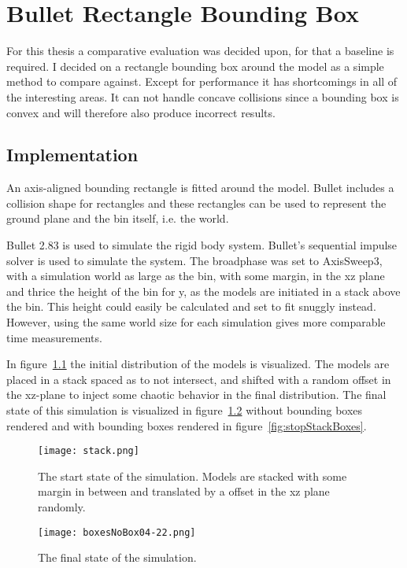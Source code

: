 \chapter{Bullet Rectangle Bounding Box}\label{cha:meth}
For this thesis a comparative evaluation was decided upon, for that a baseline is
required. I decided on a rectangle bounding box around the model
as a simple method to compare against. Except for performance it has shortcomings
in all of the interesting areas. It can not handle concave collisions since a bounding
box is convex and will therefore also produce incorrect results.

\section{Implementation}\label{sec:recImpl}
An axis-aligned bounding rectangle is fitted around the model.
Bullet includes a collision shape for rectangles and these rectangles can be used
to represent the ground plane and the bin itself, i.e. the world.

Bullet 2.83 is used to simulate the rigid body system.
Bullet's sequential impulse solver is used to simulate the system. The broadphase
was set to AxisSweep3, with a simulation world as large as the bin, with some margin, in the
xz plane and thrice the height of the bin for y, as the models are initiated in a stack
above the bin. This height could easily be calculated and set to fit snuggly instead.
However, using the same world size for each simulation gives more comparable time measurements.

In figure~\ref{fig:startStack} the initial distribution of the models is visualized.
The models are placed in a stack spaced as to not intersect, and shifted with a random
offset in the xz-plane to inject some chaotic behavior in the final distribution.
The final state of this simulation is visualized in figure~\ref{fig:stopStack}
without bounding boxes rendered and with bounding boxes rendered in figure~\ref{fig:stopStackBoxes}.

\begin{figure}[H]
  \centering
  \texttt{[image: stack.png]}
  \caption{The start state of the simulation. Models are stacked with some margin in between and translated by a offset in the xz plane randomly. }
  \label{fig:startStack}
\end{figure}

\begin{figure}[H]
  \centering
  \texttt{[image: boxesNoBox04-22.png]}
  \caption{The final state of the simulation.}
  \label{fig:stopStack}
\end{figure}

